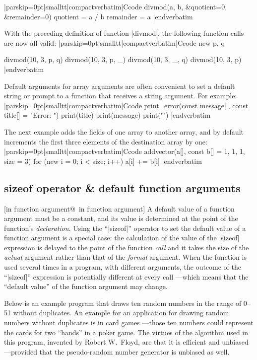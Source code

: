 \listingx\verbatim|parskip=0pt|smalltt|compactverbatim|Ccode
divmod(a, b, &quotient=0, &remainder=0)
    {
    quotient = a / b
    remainder = a %
    }
|endverbatim\endlistingx

With the preceding definition of function |divmod|, the following function
calls are now all valid:
\listingx\verbatim|parskip=0pt|smalltt|compactverbatim|Ccode
new p, q

divmod(10, 3, p, q)
divmod(10, 3, p, _)
divmod(10, 3, _, q)
divmod(10, 3, p)
|endverbatim\endlistingx

Default arguments for array arguments are often convenient to set a default
string or prompt to a function that receives a string argument. For example:
\listingx\verbatim|parskip=0pt|smalltt|compactverbatim|Ccode
print_error(const message[], const title[] = "Error: ")
    {
    print(title)
    print(message)
    print("\n")
    }
|endverbatim\endlistingx

The next example adds the fields of one array to another array, and by default
increments the first three elements of the destination array by one:
\listingx\verbatim|parskip=0pt|smalltt|compactverbatim|Ccode
addvector(a[], const b[] = {1, 1, 1}, size = 3)
    {
    for (new i = 0; i < size; i++)
        a[i] += b[i]
    }
|endverbatim\endlistingx


\subsection{sizeof operator \& default function arguments}
[in function argument@\midtilde\ in function argument]
\noindent{}%
A default value of a function argument must be a constant, and its value is
determined at the point of the function's {\it declaration}. Using the
``|sizeof|'' operator to set the default value of a function argument is a
special case: the calculation of the value of the |sizeof| expression is
delayed to the point of the function {\it call} and it takes the size of the
{\it actual\/} argument rather than that of the {\it formal\/} argument.
When the function is used several times in a program, with different arguments,
the outcome of the ``|sizeof|'' expression is potentially different at every
call ---which means that the ``default value'' of the function argument may
change.

 
Below is an example program that draws ten random numbers in the range of
0--51 without duplicates. An example for an application for drawing random
numbers without duplicates is in card games ---those ten numbers could represent
the cards for two ``hands'' in a poker game. The virtues of the algorithm used
in this program, invented by Robert W.\ Floyd, are that it is efficient and
unbiased ---provided that the pseudo-random number generator is unbiased as
well.%

